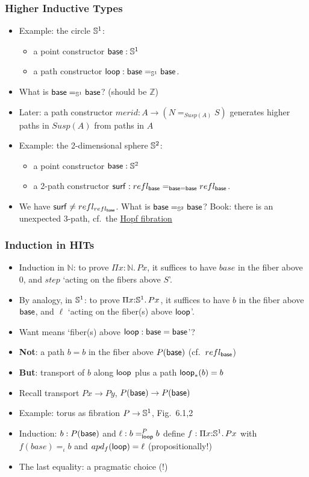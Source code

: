 \documentclass[handout]{beamer}
\newcommand{\depi}[3]{\Pi{#1{:}#2.\,#3}}
\newcommand{\Nat}{\mathbb{N}}
\newcommand{\Int}{\mathbb{Z}}
\begin{document}
\frame
  {
    \frametitle{Higher Inductive Types}

    \begin{itemize}[<+->]
    \item Example: the circle $\mathbb{S}^1$:
\begin{itemize}
\item a point constructor $\mathsf{base} :\mathbb{S}^1$
\item a path constructor $\mathsf{loop} : {\mathsf{base} =_{\mathbb{S}^1} \mathsf{base}}$.
\end{itemize}
    \item What is  $\mathsf{base} =_{\mathbb{S}^1} \mathsf{base}$? (should be $\Int$)
    \item Later: a path constructor $merid: A\to (N =_{Susp(A)} S)$ generates higher paths
             in $Susp(A)$ from paths in $A$   
    \item Example: the 2-dimensional sphere $\mathbb{S}^2$:
\begin{itemize}
\item a point constructor $\mathsf{base} :\mathbb{S}^2$
\item a 2-path constructor $\mathsf{surf} : refl_{\mathsf{base}} =_{\mathsf{base}=\mathsf{base}} refl_{\mathsf{base}}$.
\end{itemize}
    \item We have $\mathsf{surf}\neq refl_{refl_{\mathsf{base}}}$. What is  $\mathsf{base} =_{\mathbb{S}^2} \mathsf{base}$?
             Book:  there is an unexpected 3-path, cf.\ the 
             \href{http://en.wikipedia.org/wiki/Hopf_fibration}{\color{red}Hopf fibration}
    \end{itemize}
  }

 \frame
  {
    \frametitle{Induction in HITs}

    \begin{itemize}[<+->]
    \item Induction in $\Nat$:  to prove $\depi{x}{\Nat}{Px}$, it suffices
    to have $base$ in the fiber above $0$, and $step$ `acting on the fibers above $S$'.
    \item By analogy, in $\mathbb{S}^1$:  to prove $\depi{x}{\Sn^1}{Px}$, it suffices
    to have $b$ in the fiber above $\mathsf{base}$, and $\ell$ `acting on the fiber(s) above $\mathsf{loop}$'.   
    \item Want means `fiber(s) above $\mathsf{loop}: \mathsf{base} = \mathsf{base}$'?
    \item {\bf Not}: a path $b=b$ in the fiber above $P(\mathsf{base})$  (cf.\ $refl_{\mathsf{base}}$)
    \item {\bf But}: transport of $b$ along $\mathsf{loop}$ plus a path $\mathsf{loop}_*(b)=b$
    \item Recall transport $Px \to Py$, $P(\mathsf{base})\to P(\mathsf{base})$
    \item Example: torus as fibration $P\to\mathbb{S}^1$, Fig.\ 6.1,2
    \item Induction: $b: P(\mathsf{base})$ and $\ell: b =^P_{\mathsf{loop}} b$ define $f:\depi{x}{\Sn^1}{Px}$
             with $f(base) =_\iota b$ and $apd_f(\mathsf{loop}) = \ell$ (propositionally!)
    \item The last equality: a pragmatic choice (!)
    \end{itemize}
  }
   
\end{document}

